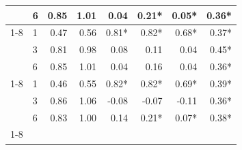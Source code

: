 \begin{table}
\begin{tabular}{llrrrrrr}
 & 6 & 0.85 & 1.01 & 0.04 & 0.21* & 0.05* & 0.36* \\
\cline{1-8}
\multirow[t]{3}{*}{rf} & 1 & 0.47 & 0.56 & 0.81* & 0.82* & 0.68* & 0.37* \\
 & 3 & 0.81 & 0.98 & 0.08 & 0.11 & 0.04 & 0.45* \\
 & 6 & 0.85 & 1.01 & 0.04 & 0.16 & 0.04 & 0.36* \\
\cline{1-8}
\multirow[t]{3}{*}{xgboost} & 1 & 0.46 & 0.55 & 0.82* & 0.82* & 0.69* & 0.39* \\
 & 3 & 0.86 & 1.06 & -0.08 & -0.07 & -0.11 & 0.36* \\
 & 6 & 0.83 & 1.00 & 0.14 & 0.21* & 0.07* & 0.38* \\
\cline{1-8}
\bottomrule
\end{tabular}
\end{table}
